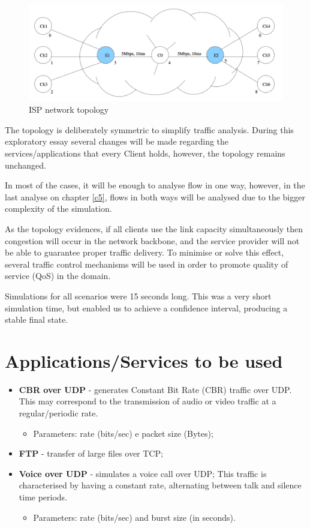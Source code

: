 \documentclass[conference,compsoc]{IEEEtran}
\begin{document}
     \begin{figure}[H]
     \centering
     \includegraphics[width=1\columnwidth]{PNG/network.png}
     \caption{ISP network topology}
     \label{fig:network}
     \end{figure}

     The topology is deliberately symmetric to simplify traffic analysis.
     During this exploratory essay several changes will be made regarding the services/applications that every Client holds, however, the topology remains unchanged. \par 
     In most of the cases, it will be enough to analyse flow in one way, however, in the last analyse on chapter \ref{c5}, flows in both ways will be analysed due to the bigger complexity of the simulation.\par 
     As the topology evidences, if all clients use the link capacity simultaneously then congestion will occur in the network backbone, and the service provider will not be able to guarantee proper traffic delivery. To minimise or solve this effect, several traffic control mechanisms will be used in order to promote quality of service (QoS) in the domain.\par 
     Simulations for all scenarios were 15 seconds long. This was a very short simulation time, but enabled us to achieve a confidence interval, producing a stable final state.

     \section{Applications/Services to be used}

     \begin{itemize}
     \item \textbf{CBR over UDP} - generates Constant Bit Rate (CBR) traffic over UDP. This may correspond to
     the transmission of audio or video traffic at a regular/periodic rate.
     \begin{itemize}
     \item Parameters: rate (bits/sec) e packet size (Bytes);
     \end{itemize}
     \item \textbf{FTP} - transfer of large files over TCP;
     \item \textbf{Voice over UDP} - simulates a voice call over UDP; This traffic is characterised by having a constant
     rate, alternating between talk and silence time periods.
     \begin{itemize}
     \item Parameters: rate (bits/sec) and burst size (in seconds).
     \end{itemize}
     \end{itemize}
\end{document}
